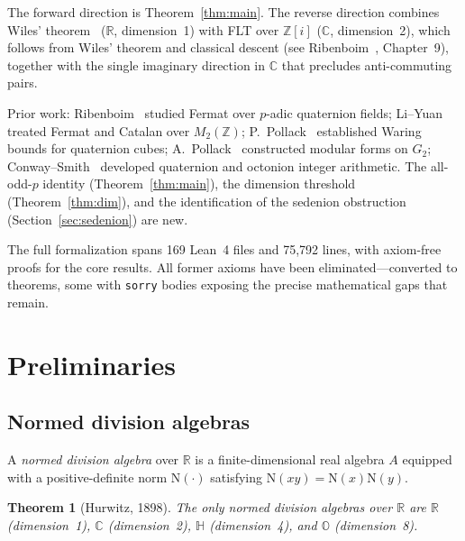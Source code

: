 \documentclass[11pt]{amsart}
\theoremstyle{plain}
\newtheorem{theorem}{Theorem}[section]
\theoremstyle{definition}
\theoremstyle{remark}
\newcommand{\Z}{\mathbb{Z}}
\newcommand{\R}{\mathbb{R}}
\newcommand{\C}{\mathbb{C}}
\newcommand{\HH}{\mathbb{H}}
\newcommand{\OO}{\mathbb{O}}
\newcommand{\Norm}[1]{\mathrm{N}(#1)}
\begin{document}
The forward direction is Theorem~\ref{thm:main}.
The reverse direction combines Wiles' theorem~\cite{Wiles1995}
($\R$, dimension~1) with
FLT over $\Z[i]$ ($\C$, dimension~2), which follows from
Wiles' theorem and classical descent (see Ribenboim~\cite{Ribenboim1979},
Chapter~9), together with the single imaginary direction in $\C$
that precludes anti-commuting pairs.

\smallskip

Prior work: Ribenboim~\cite{Ribenboim2004} studied Fermat over $p$-adic quaternion fields;
Li--Yuan~\cite{LiYuan2025} treated Fermat and Catalan over $M_2(\Z)$;
P.~Pollack~\cite{PPollack2018} established Waring bounds for quaternion cubes;
A.~Pollack~\cite{APollack2020} constructed modular forms on $G_2$;
Conway--Smith~\cite{ConwaySmith2003} developed quaternion and octonion integer arithmetic.
The all-odd-$p$ identity (Theorem~\ref{thm:main}), the dimension threshold
(Theorem~\ref{thm:dim}), and the identification of the sedenion obstruction
(Section~\ref{sec:sedenion}) are new.

The full formalization spans 169 Lean~4 files and 75{,}792 lines,
with axiom-free proofs for the core results.
All former axioms have been eliminated---converted to theorems, some with
\texttt{sorry} bodies exposing the precise mathematical gaps that remain.


\section{Preliminaries}\label{sec:prelim}

\subsection{Normed division algebras}

A \emph{normed division algebra} over $\R$ is a finite-dimensional real algebra $A$
equipped with a positive-definite norm $\Norm{\cdot}$ satisfying $\Norm{xy} = \Norm{x}\Norm{y}$.

\begin{theorem}[Hurwitz, 1898]\label{thm:hurwitz}
The only normed division algebras over $\R$ are
$\R$ (dimension~1), $\C$ (dimension~2), $\HH$ (dimension~4), and $\OO$ (dimension~8).
\end{theorem}
\end{document}
